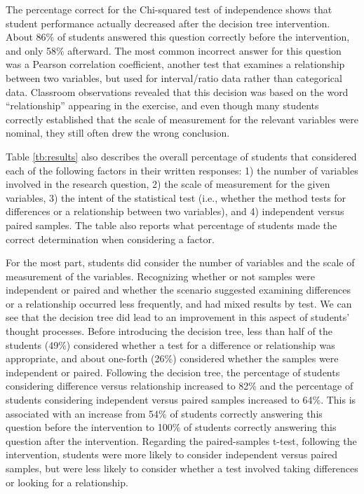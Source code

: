 \documentclass[12pt]{article}
\begin{document}
The percentage correct for the Chi-squared test of independence shows that student performance actually decreased after the decision tree intervention.  About 86\% of students answered this question correctly before the intervention, and only 58\% afterward.  The most common incorrect answer for this question was a Pearson correlation coefficient, another test that examines a relationship between two variables, but used for interval/ratio data rather than categorical data.  Classroom observations revealed that this decision was based on the word ``relationship'' appearing in the exercise, and even though many students correctly established that the scale of measurement for the relevant variables were nominal, they still often drew the wrong conclusion.

Table \ref{tb:results} also describes the overall percentage of students that considered each of the following factors in their written responses: 1) the number of variables involved in the research question, 2) the scale of measurement for the given variables, 3) the intent of the statistical test (i.e., whether the method tests for differences or a relationship between two variables), and 4) independent versus paired samples.  The table also reports what percentage of students made the correct determination when considering a factor.  

For the most part, students did consider the number of variables and the scale of measurement of the variables.  Recognizing whether or not samples were independent or paired and whether the scenario suggested examining differences or a relationship occurred less frequently, and had mixed results by test.  We can see that the decision tree did lead to an improvement in this aspect of students' thought processes.  Before introducing the decision tree, less than half of the students (49\%) considered whether a test for a difference or relationship was appropriate, and about one-forth (26\%) considered whether the samples were independent or paired.  Following the decision tree, the percentage of students considering difference versus relationship increased to 82\% and the percentage of students considering independent versus paired samples increased to 64\%.  This is associated with an increase from 54\% of students correctly answering this question before the intervention to 100\% of students correctly answering this question after the intervention.  Regarding the paired-samples t-test, following the intervention, students were more likely to consider independent versus paired samples, but were less likely to consider whether a test involved taking differences or looking for a relationship.
\end{document}
